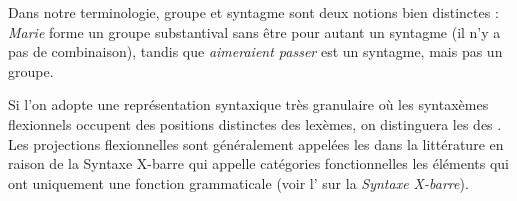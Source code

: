 Dans notre terminologie, groupe et syntagme sont deux notions bien distinctes : \textit{Marie} forme un groupe substantival sans être pour autant un syntagme (il n’y a pas de combinaison), tandis que \textit{aimeraient passer} est un syntagme, mais pas un groupe.

Si l’on adopte une représentation syntaxique très granulaire où les syntaxèmes flexionnels occupent des positions distinctes des lexèmes, on distinguera les  des . Les projections flexionnelles sont généralement appelées les  dans la littérature en raison de la Syntaxe X-barre qui appelle catégories fonctionnelles les éléments qui ont uniquement une fonction grammaticale (voir l’ sur la \textit{Syntaxe X-barre}).




